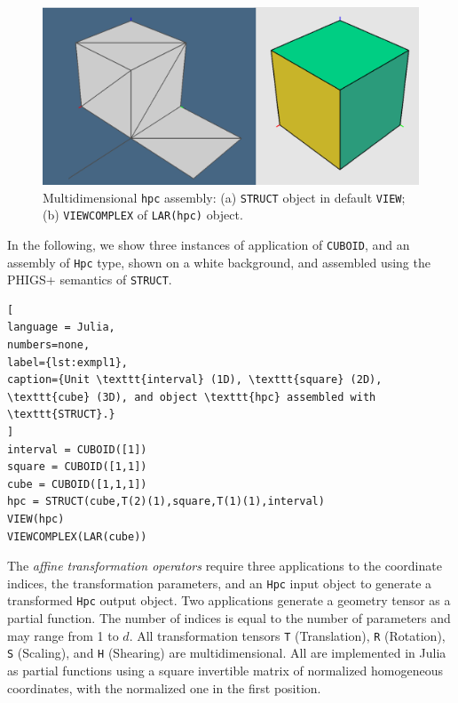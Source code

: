 \documentclass{juliacon}
\begin{document}
\begin{figure}[h]
\centerline
\includegraphics[width=\textwidth]{figs/cuboid}
\caption{Multidimensional {\tt hpc} assembly: (a) \texttt{STRUCT} object in default \texttt{VIEW}; (b) \texttt{VIEWCOMPLEX} of \texttt{LAR(hpc)} object.}
\label{sample-figure_2}
\end{figure}

In the following, we show three instances of application of \texttt{CUBOID},  and an assembly of \texttt{Hpc} type, shown on a white background, and assembled using the PHIGS+ semantics of \texttt{STRUCT}.
\begin{lstlisting}[
language = Julia,
numbers=none,
label={lst:exmpl1},
caption={Unit \texttt{interval} (1D), \texttt{square} (2D), \texttt{cube} (3D), and object \texttt{hpc} assembled with \texttt{STRUCT}.}
]
interval = CUBOID([1])
square = CUBOID([1,1])
cube = CUBOID([1,1,1])
hpc = STRUCT(cube,T(2)(1),square,T(1)(1),interval)
VIEW(hpc)
VIEWCOMPLEX(LAR(cube))
\end{lstlisting}

The \emph{affine transformation operators} require three applications to the coordinate indices, the transformation parameters, and an \texttt{Hpc} input object to generate a transformed \texttt{Hpc} output object. Two applications generate a geometry tensor as a partial function.  The number of indices is equal to the number of parameters and may range from 1 to $d$. All transformation tensors \texttt{T} (Translation), \texttt{R} (Rotation), \texttt{S} (Scaling), and \texttt{H} (Shearing) are multidimensional. All are implemented in Julia as partial functions using a square invertible matrix of normalized homogeneous coordinates, with the normalized one in the first position.
\end{document}
